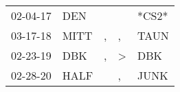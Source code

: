 \begin{supertabular}{p{0.07\textwidth}p{0.06\textwidth}p{0.02\textwidth}p{0.02\textwidth}p{0.06\textwidth}}
 02-04-17\textsuperscript{} &            DEN\textsuperscript{} &               &               &                            *CS2* \\
 03-17-18\textsuperscript{} &           MITT\textsuperscript{} &             , &             , &           TAUN\textsuperscript{} \\
 02-23-19\textsuperscript{} &            DBK\textsuperscript{} &             , &  \textgreater &            DBK\textsuperscript{} \\
 02-28-20\textsuperscript{} &           HALF\textsuperscript{} &               &             , &           JUNK\textsuperscript{} \\
\end{supertabular}

